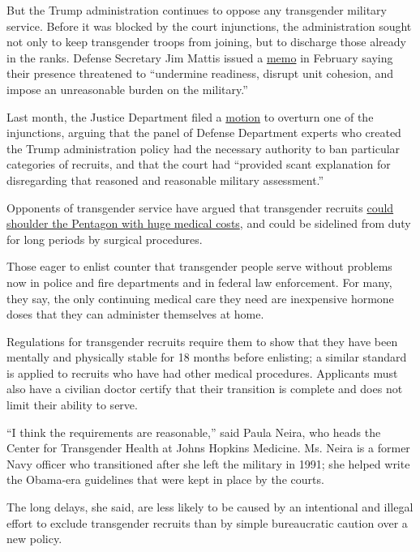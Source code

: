 But the Trump administration continues to oppose any transgender
military service. Before it was blocked by the court injunctions, the
administration sought not only to keep transgender troops from joining,
but to discharge those already in the ranks. Defense Secretary Jim
Mattis issued a
\href{https://media.defense.gov/2018/Mar/23/2001894037/-1/-1/0/MILITARY-SERVICE-BY-TRANSGENDER-INDIVIDUALS.PDF}{memo}
in February saying their presence threatened to ``undermine readiness,
disrupt unit cohesion, and impose an unreasonable burden on the
military.''

Last month, the Justice Department filed a
\href{https://www.documentcloud.org/documents/4568643-TransportRoom.html}{motion}
to overturn one of the injunctions, arguing that the panel of Defense
Department experts who created the Trump administration policy had the
necessary authority to ban particular categories of recruits, and that
the court had ``provided scant explanation for disregarding that
reasoned and reasonable military assessment.''

Opponents of transgender service have argued that transgender recruits
\href{https://hartzler.house.gov/media-center/press-releases/hartzler-statement-ndaa-amendment-reverse-obama-transgender-policy}{could
shoulder the Pentagon with huge medical costs}, and could be sidelined
from duty for long periods by surgical procedures.

Those eager to enlist counter that transgender people serve without
problems now in police and fire departments and in federal law
enforcement. For many, they say, the only continuing medical care they
need are inexpensive hormone doses that they can administer themselves
at home.

Regulations for transgender recruits require them to show that they have
been mentally and physically stable for 18 months before enlisting; a
similar standard is applied to recruits who have had other medical
procedures. Applicants must also have a civilian doctor certify that
their transition is complete and does not limit their ability to serve.

``I think the requirements are reasonable,'' said Paula Neira, who heads
the Center for Transgender Health at Johns Hopkins Medicine. Ms. Neira
is a former Navy officer who transitioned after she left the military in
1991; she helped write the Obama-era guidelines that were kept in place
by the courts.

The long delays, she said, are less likely to be caused by an
intentional and illegal effort to exclude transgender recruits than by
simple bureaucratic caution over a new policy.

